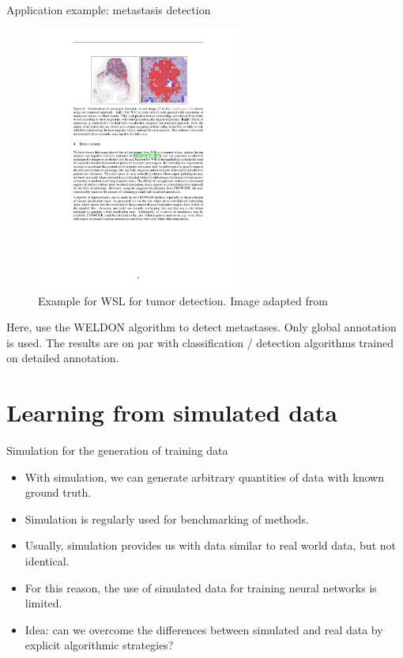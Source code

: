 \documentclass[xcolor=pdftex,dvipsnames,table]{beamer}
\begin{document}
\begin{frame}{Application example: metastasis detection}
\begin{figure}[htb]
   \centering
   \includegraphics[width=0.6\textwidth]{../graphics/wsl_example_histopathology.pdf}
   \caption{Example for WSL for tumor detection. Image adapted from \cite{courtiolClassificationDiseaseLocalization2017}}
\end{figure}
Here, \cite{courtiolClassificationDiseaseLocalization2017} use the WELDON algorithm to detect metastases. Only global annotation is used. The results are on par with classification / detection algorithms trained on detailed annotation. 
\end{frame}


\section{Learning from simulated data}

\begin{frame}{Simulation for the generation of training data}
\begin{itemize}
\item With simulation, we can generate arbitrary quantities of data with known ground truth. 
\item Simulation is regularly used for benchmarking of methods.
\item Usually, simulation provides us with data similar to real world data, but not identical. 
\item For this reason, the use of simulated data for training neural networks is limited. 
\item Idea: can we overcome the differences between simulated and real data by explicit algorithmic strategies? 
\end{itemize}
\end{frame}
\end{document}
